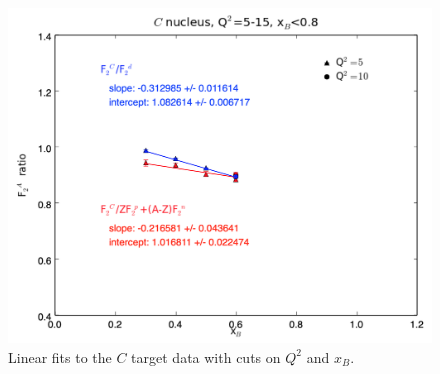 \documentclass[oneside]{article}
\begin{document}
\begin{figure}
\begin{minipage}{0.5\textwidth}
\includegraphics[width=\textwidth]{plots/q2_all_x_all/all_C.png}
\end{minipage}
  \caption[]{Linear fits to the $C$ target data with cuts on $Q^2$ and $x_B$.}
  \label{fig:fits_C}
\end{figure}   
\end{document}
